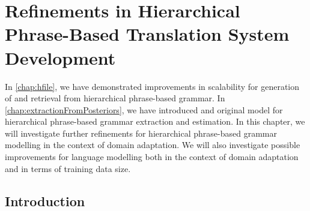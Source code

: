\chapter{Refinements in Hierarchical Phrase-Based Translation System Development}
\label{chap:wmt}


In \autoref{chap:hfile}, we have demonstrated improvements in scalability
for generation of and retrieval from hierarchical phrase-based grammar.
In \autoref{chap:extractionFromPosteriors}, we have introduced
and original model for hierarchical phrase-based grammar extraction
and estimation. In this chapter, we will investigate further
refinements for hierarchical phrase-based grammar modelling in the context
of domain adaptation. We will also investigate possible improvements
for language modelling both in the context of domain adaptation and
in terms of training data size.

\section{Introduction}

